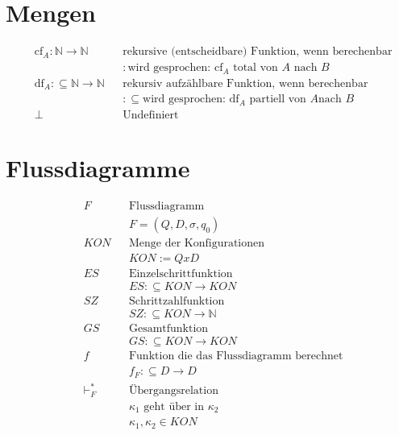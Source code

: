\documentclass[10pt,oneside,a4paper]{scrartcl}
\begin{document}
\section{Mengen}

    \begin{align}
    &\text{cf}_A :\mathbb{N} \longrightarrow \mathbb{N}
        && \text{rekursive (entscheidbare) Funktion, wenn berechenbar}\\
        &&&: \text{wird gesprochen: $\text{cf}_A$ total von $A$ nach $B$}
        \nonumber\\
    &\text{df}_A :\subseteq \mathbb{N} \longrightarrow \mathbb{N}
        && \text{rekursiv aufzählbare Funktion, wenn berechenbar}\\
        &&&:\subseteq \text{wird gesprochen: $\text{df}_A$ partiell von $A$
        nach $B$}\nonumber\\
    &\perp && \text{Undefiniert}
    \end{align}

\section{Flussdiagramme}

    \begin{align}
    &F   && \text{Flussdiagramm}\nonumber\\
            &&&F = (Q, D, \sigma, q_0)\\
    &KON && \text{Menge der Konfigurationen}\nonumber\\
            &&&KON := Q x D\\
    &ES  && \text{Einzelschrittfunktion}\nonumber\\
            &&&ES :\subseteq KON \longrightarrow KON\\
    &SZ  && \text{Schrittzahlfunktion}\nonumber\\
            &&&SZ :\subseteq KON \longrightarrow \mathbb{N}\\
    &GS  && \text{Gesamtfunktion}\nonumber\\
            &&&GS :\subseteq KON \longrightarrow KON\\
    &f   && \text{Funktion die das Flussdiagramm berechnet}\nonumber\\
            &&&f_F :\subseteq D \longrightarrow D\\
    &\vdash^{*}_{F}
         && \text{Übergangsrelation}\\
            &&&\kappa_{1} \text{ geht über in }\kappa_{2}\nonumber\\
            &&&\kappa_{1}, \kappa_{2} \in KON\nonumber
    \end{align}
\end{document}
